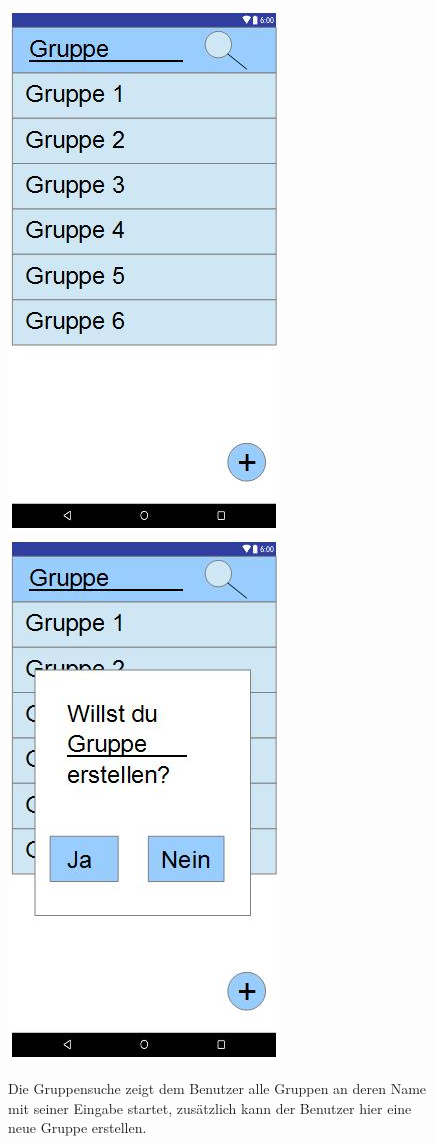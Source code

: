 \documentclass{scrartcl}
\begin{document}
	\newpage
	\begin{figure}[h]
	\includegraphics[width=.5\textwidth]{GUI_NeueGruppe.jpg}
	\includegraphics[width=.5\textwidth]{GUI_GruppeNeuBest.jpg}
	\caption{Die Gruppensuche zeigt dem Benutzer alle Gruppen an deren Name mit seiner Eingabe startet, zusätzlich kann der Benutzer hier eine neue Gruppe erstellen.}
 	\end{figure}
\end{document}

